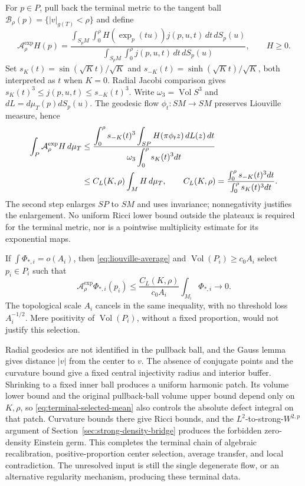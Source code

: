 \documentclass[a4paper,11pt]{article}
\numberwithin{equation}{section}
\theoremstyle{definition}
\newcommand{\Vol}{\operatorname{Vol}}
\begin{document}
For $p\in P$, pull back the terminal metric to the tangent ball $\mathcal B_\rho(p)=\{|v|_{g(T)}<\rho\}$
and define
\[
\mathcal A_\rho^{\exp}H(p)
=\frac{\displaystyle\int_{S_pM}\int_0^\rho
H(\exp_p(tu))j(p,u,t)\,dt\,dS_p(u)}
{\displaystyle\int_{S_pM}\int_0^\rho j(p,u,t)\,dt\,dS_p(u)},\qquad H\ge0.
\]
Set $s_K(t)=\sin(\sqrt Kt)/\sqrt K$ and
$s_{-K}(t)=\sinh(\sqrt Kt)/\sqrt K$, both interpreted as $t$ when $K=0$.
Radial Jacobi comparison gives $s_K(t)^3\le j(p,u,t)\le s_{-K}(t)^3$.
Write $\omega_3=\Vol S^3$ and $dL=d\mu_T(p)dS_p(u)$. The geodesic flow
$\phi_t:SM\to SM$ preserves Liouville measure, hence
\begin{align}
\int_P\mathcal A_\rho^{\exp}H\,d\mu_T
&\le\frac{\displaystyle\int_0^\rho s_{-K}(t)^3
\int_{SP}H(\pi\phi_tz)\,dL(z)\,dt}
{\displaystyle\omega_3\int_0^\rho s_K(t)^3dt}\notag\\
&\le C_L(K,\rho)\int_MH\,d\mu_T,\qquad
C_L(K,\rho)=\frac{\int_0^\rho s_{-K}(t)^3dt}
{\int_0^\rho s_K(t)^3dt}.\label{eq:liouville-average}
\end{align}
The second step enlarges $SP$ to $SM$ and uses invariance; nonnegativity justifies the enlargement.
No uniform Ricci lower bound outside the plateaux is required for the terminal metric,
nor is a pointwise multiplicity estimate for its exponential maps.

If $\int\Phi_{*,i}=o(A_i)$, then \eqref{eq:liouville-average} and
$\Vol(P_i)\ge c_0A_i$ select $p_i\in P_i$ such that
\begin{equation}\label{eq:terminal-selected-mean}
\mathcal A_\rho^{\exp}\Phi_{*,i}(p_i)
\le\frac{C_L(K,\rho)}{c_0A_i}\int_{M_i}\Phi_{*,i}\longrightarrow0.
\end{equation}
The topological scale $A_i$ cancels in the same inequality, with no threshold loss $A_i^{-1/2}$.
Mere positivity of $\Vol(P_i)$, without a fixed proportion, would not justify this selection.

Radial geodesics are not identified in the pullback ball, and the Gauss lemma gives distance $|v|$ from the center to $v$.
The absence of conjugate points and the curvature bound give a fixed central injectivity radius and interior buffer.
Shrinking to a fixed inner ball produces a uniform harmonic patch. Its volume lower bound and the original pullback-ball volume upper bound depend only on
$K,\rho$, so \eqref{eq:terminal-selected-mean} also controls the absolute defect integral on that patch.
Curvature bounds there give Ricci bounds, and the $L^2$-to-strong-$W^{2,p}$ argument of Section~\ref{sec:strong-density-bridge}
produces the forbidden zero-density Einstein germ.
This completes the terminal chain of algebraic recalibration, positive-proportion center selection, average transfer, and local contradiction.
The unresolved input is still the single degenerate flow, or an alternative regularity mechanism, producing these terminal data.
\end{document}
